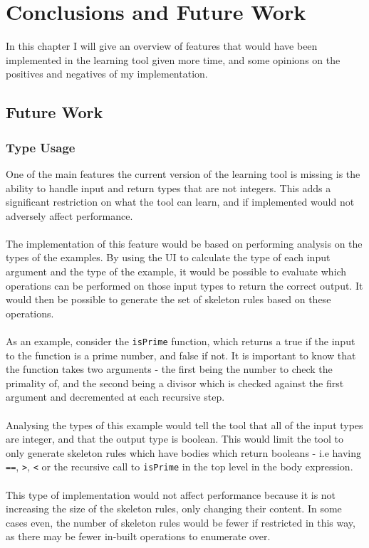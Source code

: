 \chapter{Conclusions and Future Work}

In this chapter I will give an overview of features that would have been implemented in the learning tool given more time, and some opinions on the positives and negatives of my implementation.

\section{Future Work}

\subsection{Type Usage}
One of the main features the current version of the learning tool is missing is the ability to handle input and return types that are not integers. This adds a significant restriction on what the tool can learn, and if implemented would not adversely affect performance. \\ \\
The implementation of this feature would be based on performing analysis on the types of the examples. By using the UI to calculate the type of each input argument and the type of the example, it would be possible to evaluate which operations can be performed on those input types to return the correct output. It would then be possible to generate the set of skeleton rules based on these operations. \\ \\
As an example, consider the \lstinline{isPrime} function, which returns a true if the input to the function is a prime number, and false if not. It is important to know that the function takes two arguments - the first being the number to check the primality of, and the second being a divisor which is checked against the first argument and decremented at each recursive step. \\ \\ %
Analysing the types of this example would tell the tool that all of the input types are integer, and that the output type is boolean. This would limit the tool to only generate skeleton rules which have bodies which return booleans - i.e having \lstinline{==}, \lstinline{>}, \lstinline{<} or the recursive call to \lstinline{isPrime} in the top level in the body expression. \\ \\
This type of implementation would not affect performance because it is not increasing the size of the skeleton rules, only changing their content. In some cases even, the number of skeleton rules would be fewer if restricted in this way, as there may be fewer in-built operations to enumerate over.

